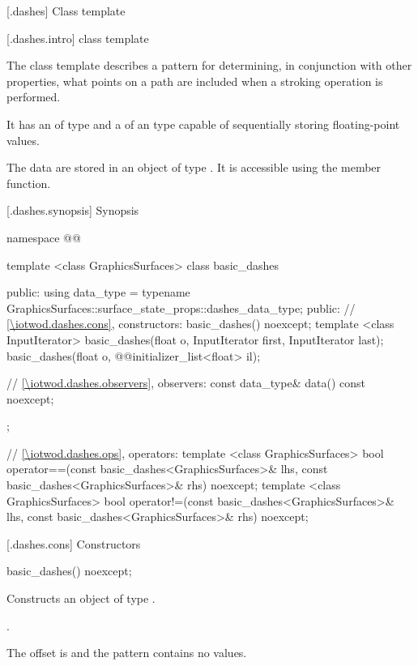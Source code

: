 
 [\iotwod.dashes] {Class template }

 [\iotwod.dashes.intro] { class template}

\pnum
{}%
The class template  describes a pattern for determining, in conjunction with other properties, what points on a path are included when a stroking operation is performed.

\pnum
It has an  of type  and a  of an \unspec type capable of sequentially storing floating-point values.

\pnum
The data are stored in an object of type . It is accessible using the  member function.

 [\iotwod.dashes.synopsis] {Synopsis}

\begin{codeblock}
namespace @\fullnamespace{}@ {
  template <class GraphicsSurfaces>
  class basic_dashes {
  public:
  using data_type = 
    typename GraphicsSurfaces::surface_state_props::dashes_data_type;
  public:
    // \ref{\iotwod.dashes.cons}, constructors:
    basic_dashes() noexcept;
    template <class InputIterator>
    basic_dashes(float o, InputIterator first, InputIterator last);
    basic_dashes(float o, @\stdqualifier{}@initializer_list<float> il);

    // \ref{\iotwod.dashes.observers}, observers:
    const data_type& data() const noexcept;
  };

  // \ref{\iotwod.dashes.ops}, operators:
  template <class GraphicsSurfaces>
  bool operator==(const basic_dashes<GraphicsSurfaces>& lhs,
    const basic_dashes<GraphicsSurfaces>& rhs) noexcept;
  template <class GraphicsSurfaces>
  bool operator!=(const basic_dashes<GraphicsSurfaces>& lhs,
    const basic_dashes<GraphicsSurfaces>& rhs) noexcept;
}
\end{codeblock}

 [\iotwod.dashes.cons] {Constructors}

%
\begin{itemdecl}
basic_dashes() noexcept;
\end{itemdecl}
\begin{itemdescr}
\pnum
\effects
Constructs an object of type .

\pnum
\postconditions
{}.

\pnum
\remarks
The offset is  and the pattern contains no values.
\end{itemdescr}

